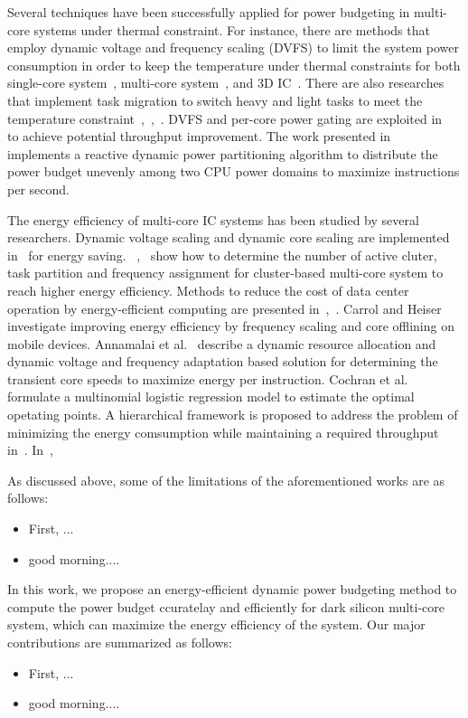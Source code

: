 Several techniques have been successfully applied for power budgeting in multi-core systems under thermal constraint. For instance, there are methods that employ dynamic voltage and frequency scaling (DVFS) to limit the system power consumption in order to keep the temperature under thermal constraints for both single-core system~\cite{Skadron:MICRO'03}, multi-core system~\cite{Jayaseelan:ICCAD'09}, and 3D IC~\cite{Coskun:DATE'09}. There are also researches that implement task migration to switch heavy and light tasks to meet the temperature constraint~\cite{Ge:DAC'10},~\cite{Chantem:TVLSI'11},~\cite{Liu:DATE'12}. DVFS and per-core power gating are exploited in~\cite{Lee:TVLSI'12} to achieve potential throughput improvement. The work presented in~\cite{Kultursay:CHSCSS'12} implements a reactive dynamic power partitioning 
algorithm to distribute the power budget unevenly among two CPU power domains to maximize instructions per second. %

The energy efficiency of multi-core IC systems has been studied by several researchers. Dynamic voltage scaling and dynamic core scaling are implemented in~\cite{Seo:TPDS'08} for energy saving. ~\cite{Majzoub:TCAD'10},~\cite{Kong:DATE'11} show how to determine the number of active cluter, task partition and frequency assignment for cluster-based multi-core system to reach higher energy efficiency. Methods to reduce the cost of data center operation by energy-efficient computing are presented in~\cite{Pedram:TCAD'12},~\cite{Wang:access'17}. Carrol and Heiser~\cite{Carroll:RTAS'14} investigate improving energy efficiency by frequency scaling and core offlining on mobile devices. Annamalai et al.~\cite{Annamalai:ISVLSI'14} describe a dynamic resource allocation and dynamic voltage and frequency adaptation based solution for determining the transient core speeds to maximize energy per instruction. Cochran et al.~\cite{Cochran:ICCAD'11} formulate a multinomial logistic regression model to estimate the optimal opetating points. A hierarchical framework is proposed to address the problem of minimizing the energy comsumption while maintaining a required throughput in~\cite{Ghasemazar:ISCAS'10}. In~\cite{Hanumaiah:TCOMP'14},

As discussed above, some of the limitations of the aforementioned works are as follows:
\begin{itemize}  
\item First, ...
\item good morning....
\end{itemize} 

In this work, we propose an energy-efficient dynamic power budgeting method to compute the power budget ccuratelay and efficiently for dark silicon multi-core system, which can maximize the energy efficiency of the system. Our major contributions are summarized as follows:
\begin{itemize}  
\item First, ...
\item good morning....
\end{itemize} 